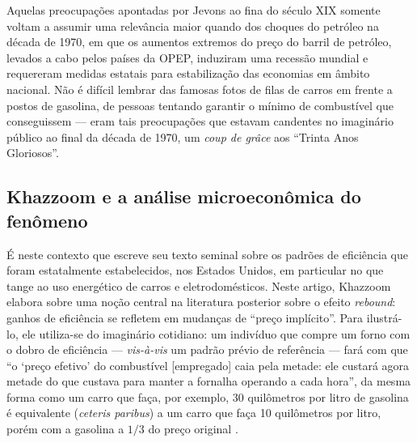 Aquelas preocupações apontadas por Jevons ao fina do século XIX somente voltam a assumir uma relevância maior quando dos choques do petróleo na década de 1970, em que os aumentos extremos do preço do barril de petróleo, levados a cabo pelos países da OPEP, induziram uma recessão mundial e requereram medidas estatais para estabilização das economias em âmbito nacional.  Não é difícil lembrar das famosas fotos de filas de carros em frente a postos de gasolina, de pessoas tentando garantir o mínimo de combustível que conseguissem --- eram tais preocupações que estavam candentes no imaginário público ao final da década de 1970, um \textit{coup de grâce} aos ``Trinta Anos Gloriosos''.

\subsection{Khazzoom e a análise microeconômica do fenômeno}
É neste contexto que \textcite{Khazzoom1980} escreve seu texto seminal sobre os padrões de eficiência que foram estatalmente estabelecidos, nos Estados Unidos, em particular no que tange ao uso energético de carros e eletrodomésticos. Neste artigo, Khazzoom elabora sobre uma noção central na literatura posterior sobre o efeito \textit{rebound}: ganhos de eficiência se refletem em mudanças de ``preço implícito''. Para ilustrá-lo, ele utiliza-se do imaginário cotidiano: um indivíduo que compre um forno com o dobro de eficiência --- \textit{vis-à-vis} um padrão prévio de referência --- fará com que ``o `preço efetivo' do combustível [empregado] caia pela metade: ele custará agora metade do que custava para manter a fornalha operando a cada hora'', da mesma forma como um carro que faça, por exemplo, 30 quilômetros por litro de gasolina é equivalente (\textit{ceteris paribus}) a um carro que faça 10 quilômetros por litro, porém com a gasolina a $1/3$ do preço original \parencite[p. 22]{Khazzoom1980}. %

